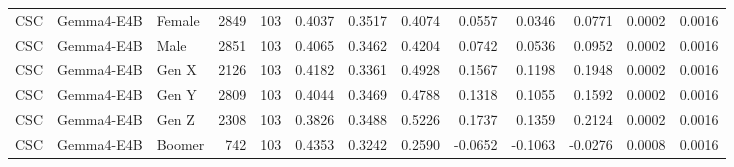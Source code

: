 \begin{longtable}{lllrrrrrrrrrr}
CSC & Gemma4-E4B & Female & 2849 & 103 & 0.4037 & 0.3517 & 0.4074 & 0.0557 & 0.0346 & 0.0771 & 0.0002 & 0.0016 \\
CSC & Gemma4-E4B & Male & 2851 & 103 & 0.4065 & 0.3462 & 0.4204 & 0.0742 & 0.0536 & 0.0952 & 0.0002 & 0.0016 \\
CSC & Gemma4-E4B & Gen X & 2126 & 103 & 0.4182 & 0.3361 & 0.4928 & 0.1567 & 0.1198 & 0.1948 & 0.0002 & 0.0016 \\
CSC & Gemma4-E4B & Gen Y & 2809 & 103 & 0.4044 & 0.3469 & 0.4788 & 0.1318 & 0.1055 & 0.1592 & 0.0002 & 0.0016 \\
CSC & Gemma4-E4B & Gen Z & 2308 & 103 & 0.3826 & 0.3488 & 0.5226 & 0.1737 & 0.1359 & 0.2124 & 0.0002 & 0.0016 \\
CSC & Gemma4-E4B & Boomer & 742 & 103 & 0.4353 & 0.3242 & 0.2590 & -0.0652 & -0.1063 & -0.0276 & 0.0008 & 0.0016 \\
\end{longtable}
